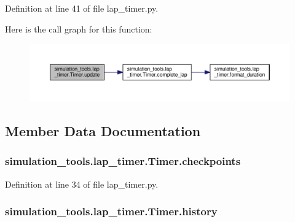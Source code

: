 Definition at line 41 of file lap\+\_\+timer.\+py.



Here is the call graph for this function\+:
\nopagebreak
\begin{figure}[H]
\begin{center}
\leavevmode
\includegraphics[width=350pt]{classsimulation__tools_1_1lap__timer_1_1_timer_ae9b21a99e315e66e34311c6b9feeb0e8_cgraph}
\end{center}
\end{figure}




\subsection{Member Data Documentation}
\subsubsection[{\texorpdfstring{checkpoints}{checkpoints}}]{\setlength{\rightskip}{0pt plus 5cm}simulation\+\_\+tools.\+lap\+\_\+timer.\+Timer.\+checkpoints}\hypertarget{classsimulation__tools_1_1lap__timer_1_1_timer_ae042ce601347d175584be16d8166a74e}{}\label{classsimulation__tools_1_1lap__timer_1_1_timer_ae042ce601347d175584be16d8166a74e}


Definition at line 34 of file lap\+\_\+timer.\+py.

\subsubsection[{\texorpdfstring{history}{history}}]{\setlength{\rightskip}{0pt plus 5cm}simulation\+\_\+tools.\+lap\+\_\+timer.\+Timer.\+history}\hypertarget{classsimulation__tools_1_1lap__timer_1_1_timer_a5f5e50dc374ab88c05748ab49392b881}{}\label{classsimulation__tools_1_1lap__timer_1_1_timer_a5f5e50dc374ab88c05748ab49392b881}


